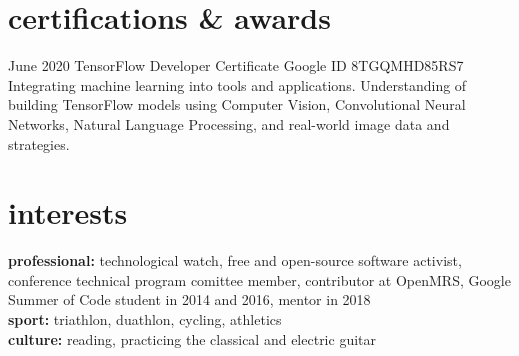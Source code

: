 \documentclass[]{cv-style}          %
\begin{document}
\section{certifications \& awards}

\begin{entrylist}
\entry
{June 2020}
{TensorFlow Developer Certificate}
{Google}
{ID 8TGQMHD85RS7 \\ Integrating machine learning into tools and applications. Understanding of building TensorFlow models using Computer Vision, Convolutional Neural Networks, Natural Language Processing, and real-world image data and strategies.}
\end{entrylist}


\section{interests}
  \vspace{-0.2cm}

\textbf{professional:} technological watch, free and open-source software activist, conference technical program comittee member, contributor at OpenMRS, Google Summer of Code student in 2014 and 2016, mentor in 2018\\
\textbf{sport:} triathlon, duathlon, cycling, athletics \\
\textbf{culture:} reading, practicing the classical and electric guitar
\end{document}
